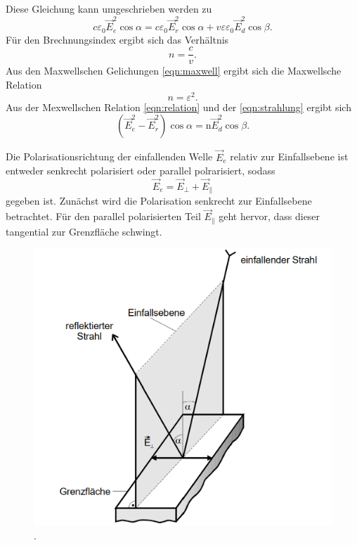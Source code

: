Diese Gleichung kann umgeschrieben werden zu 
\begin{equation}
        c \varepsilon_0 \vec{E}_e^2 \cos \alpha=c \varepsilon_0 \vec{E}_r^2 \cos \alpha+v \varepsilon \varepsilon_0 \vec{E}_d^2 \cos \beta.
        \label{eqn:strahlung}
\end{equation}
Für den Brechnungsindex ergibt sich das Verhältnis
\begin{equation}
    n = \frac{c}{v}.
    \label{eqn:brechungsindex}
\end{equation}
Aus den Maxwellschen Gelichungen \eqref{eqn:maxwell} ergibt sich die Maxwellsche Relation
\begin{equation}
    n = \varepsilon^2 .
    \label{eqn:relation}
\end{equation}
Aus der Mexwellschen Relation \eqref{eqn:relation} und der \autoref{eqn:strahlung} ergibt sich 
\begin{equation}
    \left(\vec{E}_e^2-\vec{E}_r^2\right) \cos \alpha=\mathrm{n} \vec{E}_d^2 \cos \beta .
\end{equation}

Die Polarisationsrichtung der einfallenden Welle $\vec{E}_e$ relativ zur Einfallsebene ist entweder senkrecht polarisiert oder parallel polrarisiert,
sodass
\begin{equation}
        \vec{E}_e=\vec{E}_{\perp}+\vec{E}_{\|}
\end{equation}
gegeben ist.
Zunächst wird die Polarisation senkrecht zur Einfallsebene betrachtet. Für den parallel polarisierten Teil  $\vec{E}_{\|}$ geht hervor, dass 
dieser tangential zur Grenzfläche schwingt. 
\begin{figure}[H]
	\centering
	\includegraphics[width=0.5\linewidth]{content/grafik/bild1.png}
	\caption{.}
	\label{fig:bild1}
\end{figure}
